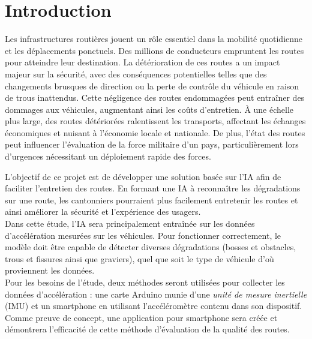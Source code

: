 \section{Introduction}
Les infrastructures routières jouent un rôle essentiel dans la mobilité quotidienne et les déplacements ponctuels. Des millions de conducteurs empruntent les routes pour atteindre leur destination. La détérioration de ces routes a un impact majeur sur la sécurité, avec des conséquences potentielles telles que des changements brusques de direction ou la perte de contrôle du véhicule en raison de trous inattendus. Cette négligence des routes endommagées peut entraîner des dommages aux véhicules, augmentant ainsi les coûts d'entretien. À une échelle plus large, des routes détériorées ralentissent les transports, affectant les échanges économiques et nuisant à l'économie locale et nationale. De plus, l'état des routes peut influencer l'évaluation de la force militaire d'un pays, particulièrement lors d'urgences nécessitant un déploiement rapide des forces.

L'objectif de ce projet est de développer une solution basée sur l'IA afin de faciliter l'entretien des routes. En formant une IA à reconnaître les dégradations sur une route, les cantonniers pourraient plus facilement entretenir les routes et ainsi améliorer la sécurité et l'expérience des usagers.\\
Dans cette étude, l'IA sera principalement entraînée sur les données d'accélération mesurées sur les véhicules. Pour fonctionner correctement, le modèle doit être capable de détecter diverses dégradations (bosses et obstacles, trous et fissures ainsi que graviers), quel que soit le type de véhicule d'où proviennent les données.\\
Pour les besoins de l'étude, deux méthodes seront utilisées pour collecter les données d'accélération : une carte Arduino munie d'une \textit{unité de mesure inertielle} (IMU) et un smartphone en utilisant l'accéléromètre contenu dans son dispositif.\\
Comme preuve de concept, une application pour smartphone sera créée et démontrera l'efficacité de cette méthode d'évaluation de la qualité des routes.